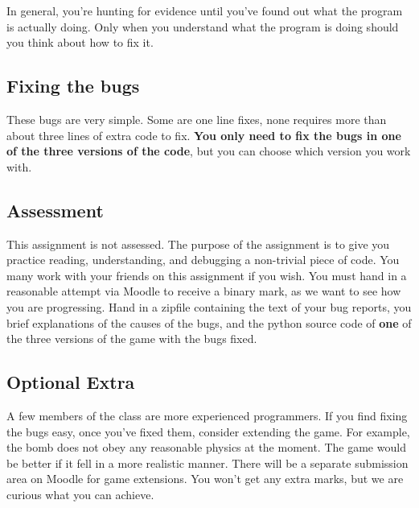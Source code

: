 \documentclass{article}
\begin{document}
In general, you're hunting for evidence until you've found out what
the program is actually doing.  Only when you understand what the
program is doing should you think about how to fix it.

\subsection*{Fixing the bugs}

These bugs are very simple.  Some are one line fixes, none requires
more than about three lines of extra code to fix.  \textbf{You only
  need to fix the bugs in one of the three versions of the code}, but
you can choose which version you work with.

\subsection*{Assessment}

This assignment is not assessed.  The purpose of the assignment is to
give you practice reading, understanding, and debugging a non-trivial
piece of code.  You many work with your friends on this assignment if
you wish.  You must hand in a reasonable attempt via Moodle to receive
a binary mark, as we want to see how you are progressing.  Hand in a
zipfile containing the text of your bug reports, you brief
explanations of the causes of the bugs, and the python source code of
\textbf{one} of the three versions of the game with the bugs fixed.

\subsection*{Optional Extra}

A few members of the class are more experienced programmers.  If you
find fixing the bugs easy, once you've fixed them, consider extending
the game.  For example, the bomb does not obey any reasonable physics
at the moment.  The game would be better if it fell in a more
realistic manner.  There will be a separate submission area on Moodle
for game extensions.  You won't get any extra marks, but we are
curious what you can achieve.
\end{document}
